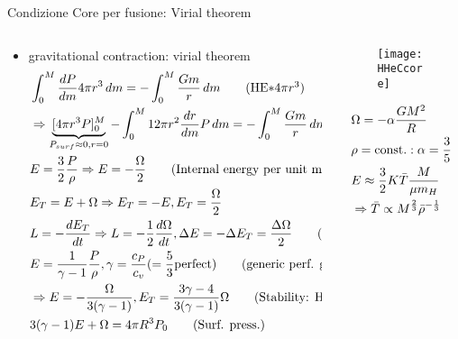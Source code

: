 \begin{frame}{Condizione Core per fusione: Virial theorem}
    \begin{columns}[T]
        \begin{column}{0.65\textwidth}
\begin{itemize}
    \item gravitational contraction: virial theorem
        \begin{align*}
            &\int_0^M\TDy{m}{P}4\pi r^3\,dm=-\int_0^M \frac{Gm}{r}\,dm\tag{HE$*4\pi r^3$}\\
            &\Rightarrow \underbrace{[4\pi r^3P]_0^M}_{P_{surf}\approx0,r=0}-\int_0^M12\pi r^2\TDy{m}{r}P\,dm=-\int_0^M \frac{Gm}{r}\,dm\\
            &E=\frac{3}{2}\frac{P}{\rho}\Rightarrow E=-\frac{\Omega}{2}\tag{Internal energy per unit mass: perfect monoatomic gas}\\
            &E_T=E+\Omega\Rightarrow E_T=-E, E_T=\frac{\Omega}{2}\\
            &L=-\TDy{t}{E_T}\Rightarrow L=-\frac{1}{2}\TDy{t}{\Omega}, \Delta E=-\Delta E_T=\frac{\Delta\Omega}{2}\tag{only grav}\\
            &E=\frac{1}{\gamma-1}\frac{P}{\rho}, \gamma=\frac{c_P}{c_v}(=\frac{5}{3}\text{perfect})\tag{generic perf. gas}\\
            &\Rightarrow E=-\frac{\Omega}{3(\gamma-1)},E_T=\frac{3\gamma-4}{3(\gamma-1)}\Omega\tag{Stability: HE $\gamma>\frac{4}{3}$}\\
            &3(\gamma-1)E+\Omega=4\pi R^3P_0\tag{Surf. press.}\\
        \end{align*}
\end{itemize}
        \end{column}
        \begin{column}{0.35\textwidth}
\begin{figure}[!ht] 
    \texttt{[image: HHeCcore]}\label{fig:HHeCcore}
\end{figure}
\begin{align*}
    &\Omega=-\alpha \frac{GM^2}{R}\\
    &\rho=\operatorname{const.}:\alpha=\frac{3}{5}\\
    &E\approx \frac{3}{2}K\bar{T}\frac{M}{\mu m_H}\\
    &\Rightarrow\bar{T}\propto M^{\frac{2}{3}}\bar{\rho}^{-\frac{1}{3}}
\end{align*}
        \end{column}
    \end{columns}
\end{frame}

